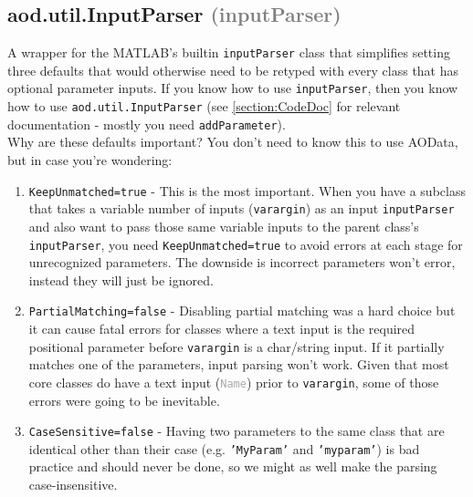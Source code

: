 \documentclass[10pt]{exam}
\newcommand\myurl[1]{\textcolor{blue}{\underline{#1}}}
\newcommand\myparent[1]{\textcolor{gray}{(#1)}}
\newcommand\aodclass[1]{\textcolor{codeblue}{\texttt{#1}}}
\newcommand\matclass[1]{\textcolor{codeblue}{\texttt{#1}}}
\newcommand\aodprop[1]{\textcolor{darkgray}{\texttt{#1}}}
\newcommand\matfcn[1]{\textcolor{darkteal}{\texttt{#1}}}
\begin{document}
	\subsection{aod.util.InputParser \myparent{inputParser}}
		\label{subsection:InputParserDoc}
		\noindent A wrapper for the MATLAB's builtin \matclass{inputParser} class that simplifies setting three defaults that would otherwise need to be retyped with every class that has optional parameter inputs. If you know how to use \matclass{inputParser}, then you know how to use \aodclass{aod.util.InputParser} (see \myurl{\ref{section:CodeDoc}} for relevant documentation - mostly you need \matfcn{addParameter}).\\
		Why are these defaults important? You don't need to know this to use AOData, but in case you're wondering:
		\begin{enumerate}
			\item \texttt{KeepUnmatched=true} - This is the most important. When you have a subclass that takes a variable number of inputs (\texttt{varargin}) as an input \matfcn{inputParser} and also want to pass those same variable inputs to the parent class's \matfcn{inputParser}, you need \texttt{KeepUnmatched=true} to avoid errors at each stage for unrecognized parameters. The downside is incorrect parameters won't error, instead they will just be ignored. 
			\item \texttt{PartialMatching=false} - Disabling partial matching was a hard choice but it can cause fatal errors for classes where a text input is the required positional parameter before \texttt{varargin} is a char/string input. If it partially matches one of the parameters, input parsing won't work. Given that most core classes do have a text input (\aodprop{Name}) prior to \texttt{varargin}, some of those errors were going to be inevitable.
			\item \texttt{CaseSensitive=false} - Having two parameters to the same class that are identical other than their case (e.g. \texttt{'MyParam'} and \texttt{'myparam'}) is bad practice and should never be done, so we might as well make the parsing case-insensitive.
		\end{enumerate}
\end{document}
